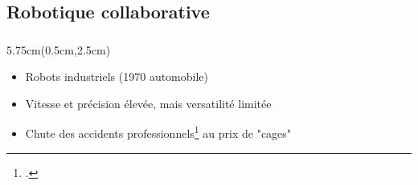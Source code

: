 \documentclass[10pt,xcolor=table]{beamer}
\begin{document}
\subsection{Robotique collaborative}
\begin{frame}
\frametitle{\insertsubsection}
	\begin{textblock*}{5.75cm}(0.5cm,2.5cm) %
		\begin{itemize}[<+>]
			\item<1> Robots industriels (1970 automobile)
			\item<1> Vitesse et précision élevée, mais versatilité limitée
			\item<1> Chute des accidents professionnels\footcite{gihleb_industrial_2020} au prix de "cages"
		\end{itemize}
	\end{textblock*}


\end{frame}
\end{document}
